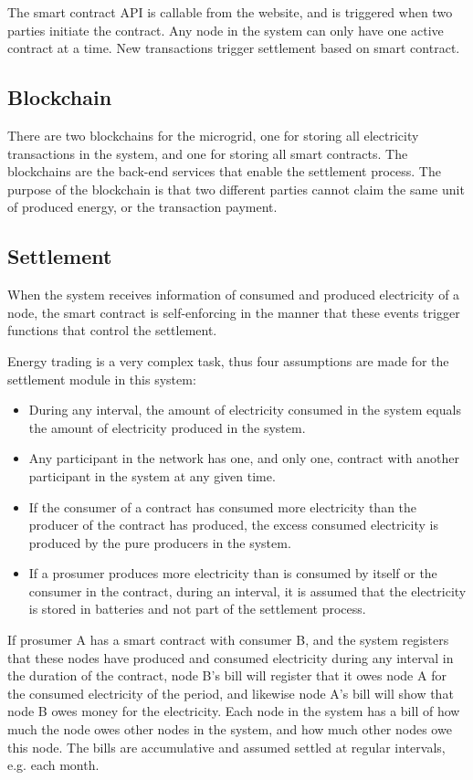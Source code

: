The smart contract API is callable from the website, and is triggered when two parties initiate the contract. Any node in the system can only have one active contract at a time. New transactions trigger settlement based on smart contract.

\subsection{Blockchain}
There are two blockchains for the microgrid, one for storing all electricity transactions in the system, and one for storing all smart contracts. The blockchains are the back-end services that enable the settlement process. The purpose of the blockchain is that two different parties cannot claim the same unit of produced energy, or the transaction payment.

\subsection{Settlement} \label{settlement_1}
When the system receives information of consumed and produced electricity of a node, the smart contract is self-enforcing in the manner that these events trigger functions that control the settlement. 

Energy trading is a very complex task, thus four assumptions are made for the settlement module in this system:
\begin{itemize}
\item During any interval, the amount of electricity consumed in the system equals the amount of electricity produced in the system.
\item Any participant in the network has one, and only one, contract with another participant in the system at any given time.
\item If the consumer of a contract has consumed more electricity than the producer of the contract has produced, the excess consumed electricity is produced by the pure producers in the system.
\item If a prosumer produces more electricity than is consumed by itself or the consumer in the contract, during an interval, it is assumed that the electricity is stored in batteries and not part of the settlement process.
\end{itemize}


If prosumer A has a smart contract with consumer B, and the system registers that these nodes have produced and consumed electricity during any interval in the duration of the contract, node B's bill will register that it owes node A for the consumed electricity of the period, and likewise node A's bill will show that node B owes money for the electricity. Each node in the system has a bill of how much the node owes other nodes in the system, and how much other nodes owe this node. The bills are accumulative and assumed settled at regular intervals, e.g. each month.

